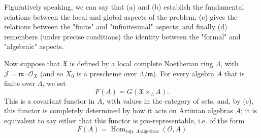  Figuratively speaking, we can say that (a) and (b) establish the fundamental relations between the local and global aspects of the problem; (c) gives the relations between the "finite" and "infinitesimal" aspects; and finally (d) remembers (under precise conditions) the identity between the "formal" and "algebraic" aspects.\par{}Now suppose that \(\mathfrak {X}\) is defined by a local complete Noetherian ring \(\Lambda \), with \(\mathscr {J}=\mathfrak {m}\cdot \mathscr {O}_X\) (and so \(X_0\) is a prescheme over \({\Lambda }/\mathfrak {m}\)).
  For every algebra \(A\) that is finite over \(\Lambda \), we set
  \[     F(A)     = G(\mathfrak {X}\times _\Lambda  A).   \]
  This is a covariant functor in \(A\), with values in the category of sets, and, by (c), this functor is completely determined by how it acts on Artinian algebras \(A\);
  it is equivalent to say either that this functor is pro-representable, i.e. of the form
  \[     F(A)     = \operatorname {Hom}_{\text {top. }\Lambda \text {-algebras}}(\mathscr {O},A)   \]
  
